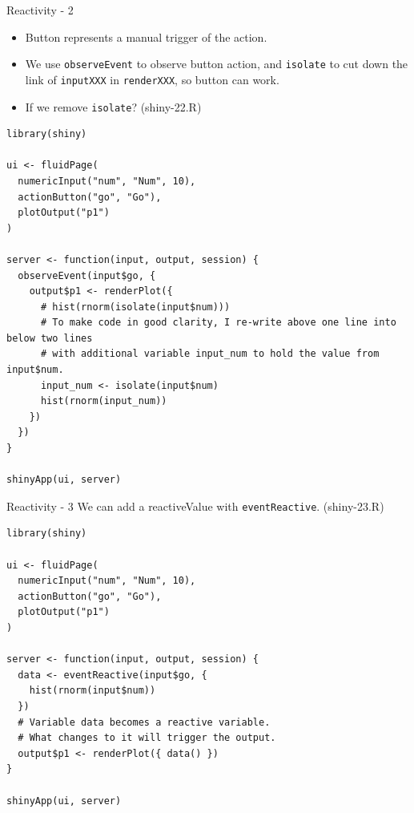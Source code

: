 \documentclass[
  10pt,
  ignorenonframetext,
  serif]{beamer}
\providecommand{\tightlist}{%
  \setlength{\itemsep}{0pt}\setlength{\parskip}{0pt}}
\begin{document}
\begin{frame}[fragile]{Reactivity - 2}
\protect\hypertarget{reactivity---2}{}
\begin{itemize}
\tightlist
\item
  Button represents a manual trigger of the action.
\item
  We use \texttt{observeEvent} to observe button action, and
  \texttt{isolate} to cut down the link of \texttt{inputXXX} in
  \texttt{renderXXX}, so button can work.
\item
  If we remove \texttt{isolate}? (shiny-22.R)
\end{itemize}

\begin{verbatim}
library(shiny)

ui <- fluidPage(
  numericInput("num", "Num", 10),
  actionButton("go", "Go"),
  plotOutput("p1")
)

server <- function(input, output, session) {
  observeEvent(input$go, {
    output$p1 <- renderPlot({
      # hist(rnorm(isolate(input$num)))
      # To make code in good clarity, I re-write above one line into below two lines
      # with additional variable input_num to hold the value from input$num.
      input_num <- isolate(input$num)
      hist(rnorm(input_num))
    }) 
  })
}

shinyApp(ui, server)
\end{verbatim}
\end{frame}

\begin{frame}[fragile]{Reactivity - 3}
\protect\hypertarget{reactivity---3}{}
We can add a reactiveValue with \texttt{eventReactive}. (shiny-23.R)

\begin{verbatim}
library(shiny)

ui <- fluidPage(
  numericInput("num", "Num", 10),
  actionButton("go", "Go"),
  plotOutput("p1")
)

server <- function(input, output, session) {
  data <- eventReactive(input$go, {
    hist(rnorm(input$num))
  })
  # Variable data becomes a reactive variable.
  # What changes to it will trigger the output.
  output$p1 <- renderPlot({ data() })
}

shinyApp(ui, server)
\end{verbatim}
\end{frame}
\end{document}
